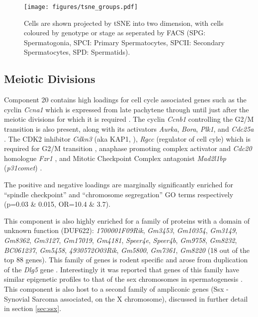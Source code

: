\begin{figure}[H]
	\centering
	\texttt{[image: figures/tsne\_groups.pdf]}
	\caption{
		Cells are shown projected by tSNE into two dimension, with cells coloured by genotype or stage as seperated by FACS (SPG: Spermatogonia, SPCI: Primary Spermatocytes, SPCII: Secondary Spermatocytes, SPD: Spermatids).
	}
	\label{fig:tsneGroups}
\end{figure}



\subsection{Meiotic Divisions}
Component 20 contains high loadings for cell cycle associated genes such as the cyclin \textit{Ccna1} which is expressed from late pachytene through until just after the meiotic divisions \parencite{Sweeney1996distinct} for which it is required \parencite{Liu1998Cyclin}. The cyclin \textit{Ccnb1} controlling the G2/M transition is also present, along with its activators \textit{Aurka}, \textit{Bora}, \textit{Plk1}, and \textit{Cdc25a} \parencite[][Reviewed in ]{Joukov2018AuroraPLK1}. The CDK2 inhibitor \textit{Cdkn3} (aka KAP1, \parencite{Poon1995Dephosphorylation}), \textit{Rgcc} (regulator of cell cyle) which is required for G2/M transition \parencite{Saigusa2007RGC32}, anaphase promoting complex activator and \textit{Cdc20} homologue \textit{Fzr1} \parencite{Holt2014APC}, and Mitotic Checkpoint Complex antagonist \textit{Mad2l1bp} (\textit{p31comet}) \parencite{Habu2002Identification}.

The positive and negative loadings are marginally significantly enriched for ``spindle checkpoint'' and ``chromosome segregation'' GO terms respectively (p=0.03 \& 0.015, OR=10.4 \& 3.7).

This component is also highly enriched for a family of proteins with a domain of unknown function (DUF622): \textit{1700001F09Rik}, \textit{Gm3453}, \textit{Gm10354}, \textit{Gm3149}, \textit{Gm8362}, \textit{Gm3127}, \textit{Gm17019}, \textit{Gm4181}, \textit{Speer4e}, \textit{Speer4b}, \textit{Gm9758}, \textit{Gm8232}, \textit{BC061237}, \textit{Gm5458}, \textit{4930572O03Rik}, \textit{Gm5800}, \textit{Gm7361}, \textit{Gm8220} (18 out of the top 88 genes). This family of genes is rodent specific and arose from duplication of the \textit{Dlg5} gene \parencite{Church2009Lineagespecific}. Interestingly it was reported that genes of this family have similar epigenetic profiles to that of the sex chromosomes in spermatogenesis \parencite{Moretti2016Expression}. This component is also host to a second family of ampliconic genes (Ssx - Synovial Sarcoma associated, on the X chromosome), discussed in further detail in section \ref{sec:ssx}.

